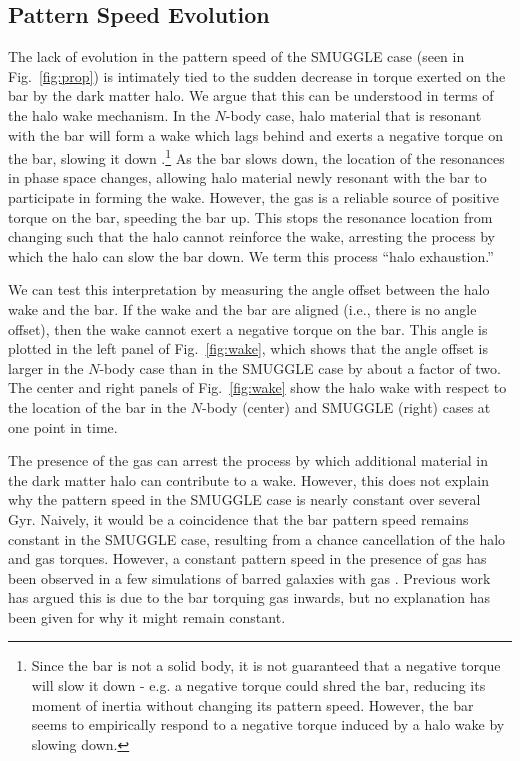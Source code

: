 \documentclass[twocolumn,linenumbers]{aastex631}
\newcommand{\Nbody}{$N$-body}
\newcommand{\SMUGGLE}{SMUGGLE}
\begin{document}
\subsection{Pattern Speed Evolution}
The lack of evolution in the pattern speed of the \SMUGGLE{} case (seen in
Fig.~\ref{fig:prop}) is intimately tied to the sudden decrease in torque exerted
on the bar by the dark matter halo. We argue that this can be understood in
terms of the halo wake mechanism. In the \Nbody{} case, halo material that is
resonant with the bar will form a wake which lags behind and exerts a negative
torque on the bar, slowing it down \citep{1984MNRAS.209..729T,
1985MNRAS.213..451W, 1992ApJ...400...80H}.\footnote{Since the bar is not a solid
body, it is not guaranteed that a negative torque will slow it down - e.g. a
negative torque could shred the bar, reducing its moment of inertia without
changing its pattern speed. However, the bar seems to empirically respond to a
negative torque induced by a halo wake by slowing down.} As the bar slows down,
the location of the resonances in phase space changes, allowing halo material
newly resonant with the bar to participate in forming the wake. However, the gas
is a reliable source of positive torque on the bar, speeding the bar up. This
stops the resonance location from changing such that the halo cannot reinforce
the wake, arresting the process by which the halo can slow the bar down. We term
this process ``halo exhaustion.''

We can test this interpretation by measuring the angle offset between the halo
wake and the bar. If the wake and the bar are aligned (i.e., there is no angle
offset), then the wake cannot exert a negative torque on the bar. This angle
is plotted in the left panel of Fig.~\ref{fig:wake}, which shows that the
angle offset is larger in the \Nbody{} case than in the \SMUGGLE{} case by about a
factor of two. The center and right panels of Fig.~\ref{fig:wake} show the halo
wake with respect to the location of the bar in the \Nbody{} (center) and \SMUGGLE{}
(right) cases at one point in time.

The presence of the gas can arrest the process by which additional material in
the dark matter halo can contribute to a wake. However, this does not explain
why the pattern speed in the \SMUGGLE{} case is nearly constant over several Gyr.
Naively, it would be a coincidence that the bar pattern speed remains constant
in the \SMUGGLE{} case, resulting from a chance cancellation of the halo and gas
torques. However, a constant pattern speed in the presence of gas has been
observed in a few simulations of barred galaxies with
gas \citep{1993AA...268...65F, 2010ApJ...719.1470V, 2014MNRAS.438L..81A}. Previous
work has argued this is due to the bar torquing gas inwards, but no explanation
has been given for why it might remain constant.
\end{document}
